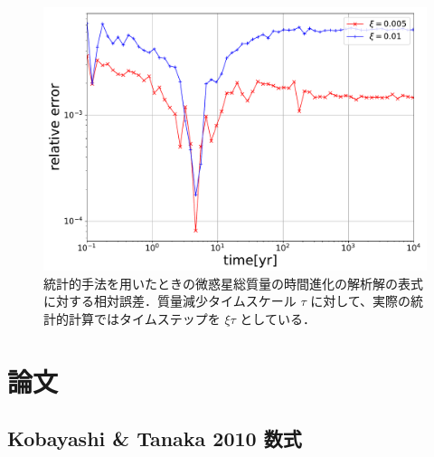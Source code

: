 \documentclass[11pt,a4paper,oneside,onecolumn]{jreport}
\begin{document}
\begin{figure}[H]
 \centering
 \includegraphics[width=12cm]{./image/MassDepletion_relative_error.pdf}
 \caption{統計的手法を用いたときの微惑星総質量の時間進化の解析解の表式\cite{3}に対する相対誤差．質量減少タイムスケール $\tau$ に対して、実際の統計的計算ではタイムステップを $\xi \tau$ としている．\label{}}
\end{figure}






\appendix
\chapter{論文}

\section{Kobayashi \& Tanaka 2010 数式}
\end{document}
